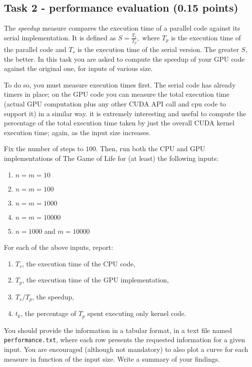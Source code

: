 \documentclass[a4paper, 11pt]{article}
\begin{document}
	
	\subsection{Task 2 - performance evaluation (0.15 points)}
	
	The \emph{speedup} measure compares the execution time of a parallel code against its serial implementation. It is defined as
	\begin{math}
	S = \frac{T_s}{T_p},
	\end{math}
	where $T_p$ is the execution time of the parallel code and $T_s$ is the execution time of the serial version. The greater $S$, the better.
	In this task you are asked to compute the speedup of your GPU code against the original one, for inputs of various size. 
	
	To do so, you must measure execution times first. The serial code has already timers in place; on the GPU code you can measure the total execution time (actual GPU computation plus any other CUDA API call and cpu code to support it) in a similar way. it is extremely interesting and useful to compute the percentage of the total execution time taken by just the overall CUDA kernel execution time; again, as the input size increases.
	
	Fix the number of steps to $100$. Then, run both the CPU and GPU implementations of The Game of Life for (at least) the following inputs:
	\begin{enumerate}
		\item $n = m = 10$
		\item $n = m = 100$
		\item $n = m = 1000$
		\item $n = m = 10000$
		\item $n = 1000$ and $m = 10000$
	\end{enumerate}
	
	\noindent For each of the above inputs, report:
	
	\begin{enumerate}
		\item $T_s$, the execution time of the CPU code,
		\item $T_p$, the execution time of the GPU implementation,
		\item $T_s/T_p$, the speedup,
		\item $t_k$, the percentage of $T_p$ spent executing only kernel code. 
	\end{enumerate}

You should provide the information in a tabular format, in a text file named \texttt{performance.txt}, where each row presents the requested information for a given input. You are encouraged (although not mandatory) to also plot a curve for each measure in function of the input size. Write a summary of your findings.
\end{document}

